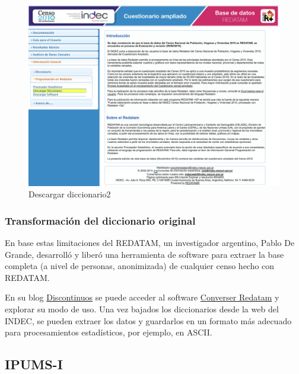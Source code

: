 \documentclass[
]{book}
\begin{document}
\begin{figure}

{\centering \includegraphics[width=0.8\linewidth]{imagenes/dic2010} 

}

\caption{Descargar diccionario2}\label{fig:unnamed-chunk-32}
\end{figure}

\hypertarget{transformaciuxf3n-del-diccionario-original}{%
\subsubsection{Transformación del diccionario original}\label{transformaciuxf3n-del-diccionario-original}}

En base estas limitaciones del REDATAM, un investigador argentino, Pablo De Grande, desarrolló y liberó una herramienta de software para extraer la base completa (a nivel de personas, anonimizada) de cualquier censo hecho con REDATAM.

En su blog \href{https://idiscontinuos.wordpress.com/2015/03/21/convirtiendo-bases-redatam-a-spss/}{Discontinuos} se puede acceder al software \href{https://www.aacademica.org/conversor.redatam}{Converser Redatam} y explorar su modo de uso. Una vez bajados los diccionarios desde la web del INDEC, se pueden extraer los datos y guardarlos en un formato más adecuado para procesamientos estadísticos, por ejemplo, en ASCII.

\hypertarget{ipums-i}{%
\subsection{IPUMS-I}\label{ipums-i}}
\end{document}
